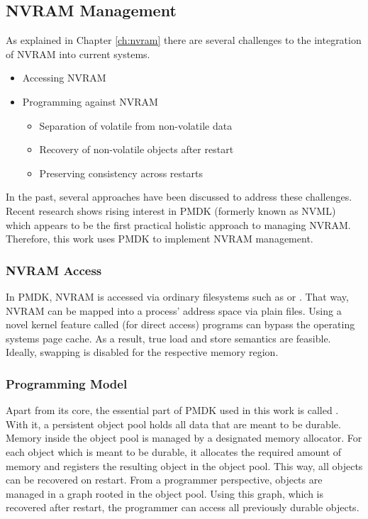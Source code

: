 
\subsection{NVRAM Management}
\label{ch:impl-pmdk}

As explained in Chapter \ref{ch:nvram} there are several challenges to the integration of NVRAM into current systems.

\begin{itemize}
    \item Accessing NVRAM
    \item Programming against NVRAM
    \begin{itemize}
        \item Separation of volatile from non-volatile data
        \item Recovery of non-volatile objects after restart
        \item Preserving consistency across restarts
    \end{itemize}
\end{itemize}

In the past, several approaches have been discussed to address these challenges.
Recent research shows rising interest in PMDK (formerly known as NVML) which
appears to be the first practical holistic approach to managing NVRAM.
Therefore, this work uses PMDK to implement NVRAM management.

\subsubsection{NVRAM Access}

In PMDK, NVRAM is accessed via ordinary filesystems such as  or
. That way, NVRAM can be mapped into a process' address space via
plain files. Using a novel kernel feature called  (for direct access)
programs can bypass the operating systems page cache. As a result, true load and
store semantics are feasible. Ideally, swapping is disabled for the respective
memory region.

\subsubsection{Programming Model}

Apart from its core, the essential part of PMDK used in this work is called
. With it, a persistent object pool holds all data that are meant
to be durable. Memory inside the object pool is managed by a designated memory
allocator. For each object which is meant to be durable, it allocates the
required amount of memory and registers the resulting object in the object pool.
This way, all objects can be recovered on restart. From a programmer
perspective, objects are managed in a graph rooted in the object pool. Using
this graph, which is recovered after restart, the programmer can access all
previously durable objects.

